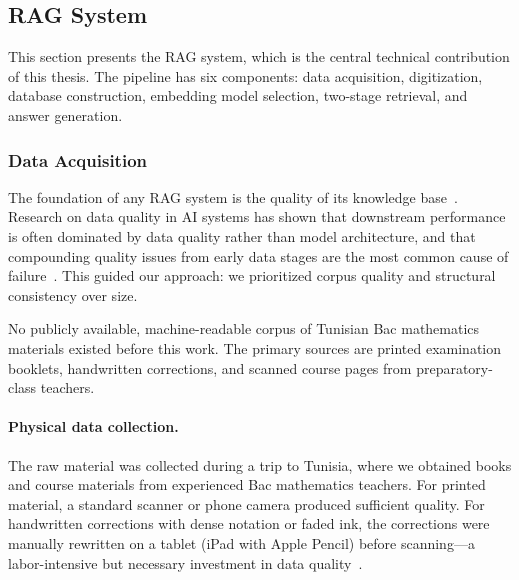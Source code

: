 
\subsection{RAG System}
\label{sec:rag-system}

This section presents the RAG system, which is the central technical
contribution of this thesis. The pipeline has six components: data
acquisition, digitization, database construction, embedding model selection,
two-stage retrieval, and answer generation.


\subsubsection{Data Acquisition}
\label{subsec:data-acquisition}

The foundation of any RAG system is the quality of its knowledge
base~\cite{lewis2020rag, gao2024rag_survey}. Research on data quality in
AI systems has shown that downstream performance is often dominated by data
quality rather than model architecture, and that compounding quality issues
from early data stages are the most common cause of
failure~\cite{sambasivan2021everyone}. This guided our approach: we
prioritized corpus quality and structural consistency over size.

No publicly available, machine-readable corpus of Tunisian Bac mathematics
materials existed before this work. The primary sources are printed
examination booklets, handwritten corrections, and scanned course pages
from preparatory-class teachers.

\paragraph{Physical data collection.}
The raw material was collected during a trip to Tunisia, where we obtained
books and course materials from experienced Bac mathematics teachers. For
printed material, a standard scanner or phone camera produced sufficient
quality. For handwritten corrections with dense notation or faded ink, the
corrections were manually rewritten on a tablet (iPad with Apple Pencil)
before scanning---a labor-intensive but necessary investment in data
quality~\cite{sambasivan2021everyone, wang2023ocrbench,
mahdavi2019icdar_math}.

